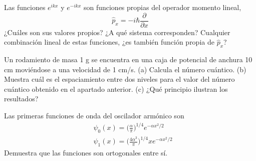 \documentclass[addpoints,spanish, 12pt,a4paper]{exam}
\begin{document}
\begin{questions}
    \question[2\half] Las funciones $e^{ikx}$ y $e^{-ikx}$ son funciones propias
    del operador momento lineal, 
    \begin{equation*}
        \hat{p}_x=-i\hbar \frac{\partial}{\partial x}
    \end{equation*}
    ¿Cuáles son sus valores propios? ¿A qué sistema corresponden? Cualquier combinación lineal de estas funciones, ¿es también función
    propia de $\hat{p}_x$?
    \newpage 
    
    
    \question[2\half] 
     Un rodamiento de masa 1 g se encuentra en una caja  de potencial de
     anchura 10 cm moviéndose a una velocidad de 1 cm/s. 
     (a) Calcula el número cuántico. 
     (b) Muestra cuál es el espaciamiento entre dos niveles para el valor del 
     número cuántico obtenido en el apartado anterior. 
     (c) ¿Qué principio ilustran los resultados?
    \newpage
    
    \question[2\half] Las primeras funciones de onda del oscilador armónico
    son 
    \begin{align*}
        & \psi_0(x)=\bigg(\frac{\alpha}{\pi}\bigg)^{1/4}e^{-\alpha x^2/2} \\
        & \psi_1(x)=\bigg(\frac{4\alpha^3}{\pi}\bigg)^{1/4}xe^{-\alpha x^2/2}
    \end{align*}
    Demuestra que las funciones son ortogonales entre sí.
    \newpage    


\end{questions}
\end{document}
